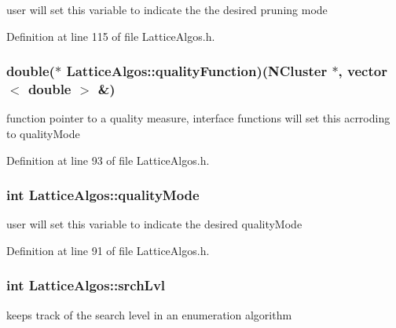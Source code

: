 user will set this variable to indicate the the desired pruning mode 



Definition at line 115 of file LatticeAlgos.h.

\hypertarget{class_lattice_algos_ae25f31284b5956278f390d0edc412ef8}{
\subsubsection[{qualityFunction}]{\setlength{\rightskip}{0pt plus 5cm}double($\ast$ {\bf LatticeAlgos::qualityFunction})({\bf NCluster} $\ast$, vector$<$ double $>$ \&)}}
\label{class_lattice_algos_ae25f31284b5956278f390d0edc412ef8}


function pointer to a quality measure, interface functions will set this acrroding to qualityMode 



Definition at line 93 of file LatticeAlgos.h.

\hypertarget{class_lattice_algos_aabdafd3fa45b3ed1d773b313e3a60e17}{
\subsubsection[{qualityMode}]{\setlength{\rightskip}{0pt plus 5cm}int {\bf LatticeAlgos::qualityMode}}}
\label{class_lattice_algos_aabdafd3fa45b3ed1d773b313e3a60e17}


user will set this variable to indicate the desired qualityMode 



Definition at line 91 of file LatticeAlgos.h.

\hypertarget{class_lattice_algos_a7061dd2e2590fa24e0dfb16f28509dce}{
\subsubsection[{srchLvl}]{\setlength{\rightskip}{0pt plus 5cm}int {\bf LatticeAlgos::srchLvl}}}
\label{class_lattice_algos_a7061dd2e2590fa24e0dfb16f28509dce}


keeps track of the search level in an enumeration algorithm 



